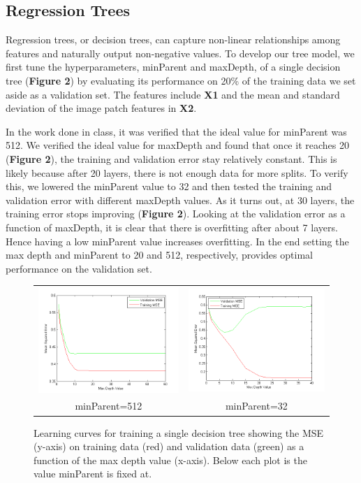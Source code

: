 \documentclass[12pt] {article}
\renewcommand{\baselinestretch}{1.2} %
\begin{document}
\subsection{Regression Trees}
Regression trees, or decision trees, can capture non-linear relationships among features and naturally output non-negative values. To develop our tree model, we first tune the hyperparameters, minParent and maxDepth, of a single decision tree (\textbf{Figure 2}) by evaluating its performance on 20\% of the training data we set aside as a validation set. The features include \textbf{X1} and the mean and standard deviation of the image patch features in \textbf{X2}.

In the work done in class, it was verified that the ideal value for minParent was 512. We verified the ideal value for maxDepth and found that once it reaches 20 (\textbf{Figure 2}), the training and validation error stay relatively constant. This is likely because after 20 layers, there is not enough data for more splits. To verify this, we lowered the minParent value to 32 and then tested the training and validation error with different maxDepth values. As it turns out, at 30 layers, the training error stops improving (\textbf{Figure 2}). Looking at the validation error as a function of maxDepth, it is clear that there is overfitting after about 7 layers. Hence having a low minParent value increases overfitting. In the end setting the max depth and minParent to 20 and 512, respectively, provides optimal performance on the validation set.
\renewcommand{\baselinestretch}{1.0} %
\begin{figure}[h!] \centering
\begin{tabular}{cc}
\includegraphics[width=.45\textwidth]{figdir/maxDepthVersusMSE.png} &
\includegraphics[width=.45\textwidth]{figdir/maxDepthVersusMSE2.png} \\
minParent=512 & minParent=32 \\
\end{tabular}
\caption{Learning curves for training a single decision tree showing the MSE (y-axis) on training data (red) and validation data (green) as a function of the max depth value (x-axis). Below each plot is the value minParent is fixed at.}
\end{figure}
\renewcommand{\baselinestretch}{1.2} %
\end{document}
